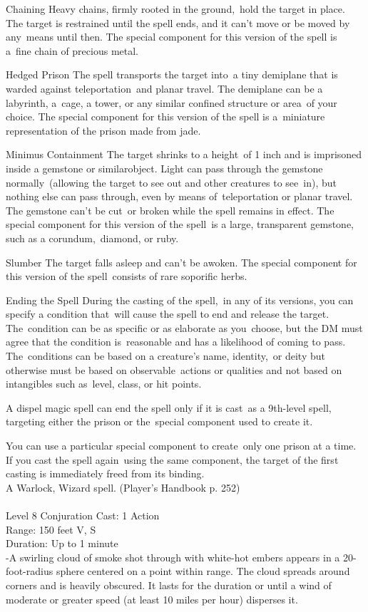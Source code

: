 \documentclass[10pt,twocolumn]{report}
\begin{document}
Chaining
Heavy chains, firmly rooted in the ground, hold the target in place. The target is restrained until the spell ends, and it can’t move or be moved by any means until then.
The special component for this version of the spell is a fine chain of precious metal.

Hedged Prison
The spell transports the target into a tiny demiplane that is warded against teleportation and planar travel. The demiplane can be a labyrinth, a cage, a tower, or any similar confined structure or area of your choice.
The special component for this version of the spell is a miniature representation of the prison made from jade.

Minimus Containment
The target shrinks to a height of 1 inch and is imprisoned inside a gemstone or similarobject. Light can pass through the gemstone normally (allowing the target to see out and other creatures to see in), but nothing else can pass through, even by means of teleportation or planar travel. The gemstone can’t be cut or broken while the spell remains in effect.
The special component for this version of the spell is a large, transparent gemstone, such as a corundum, diamond, or ruby.

Slumber
The target falls asleep and can’t be awoken.
The special component for this version of the spell consists of rare soporific herbs. 

Ending the Spell
During the casting of the spell, in any of its versions, you can specify a condition that will cause the spell to end and release the target. The condition can be as specific or as elaborate as you choose, but the DM must agree that the condition is reasonable and has a likelihood of coming to pass. The conditions can be based on a creature’s name, identity, or deity but otherwise must be based on observable actions or qualities and not based on intangibles such as level, class, or hit points.

A dispel magic spell can end the spell only if it is cast as a 9th-level spell, targeting either the prison or the special component used to create it.

You can use a particular special component to create only one prison at a time. If you cast the spell again using the same component, the target of the first casting is immediately freed from its binding.\\
A Warlock, Wizard spell. (Player's Handbook p. 252) \\


 \\
Level 8 \quad Conjuration \quad Cast: 1 Action\\
Range: 150 feet \quad V, S\\
Duration: Up to 1 minute \quad \\
-A swirling cloud of smoke shot through with white-hot embers appears in a 20-foot-radius sphere centered on a point within range.
The cloud spreads around corners and is heavily obscured. It lasts for the duration or until a wind of moderate or greater speed (at least 10 miles per hour) disperses it.
\end{document}
